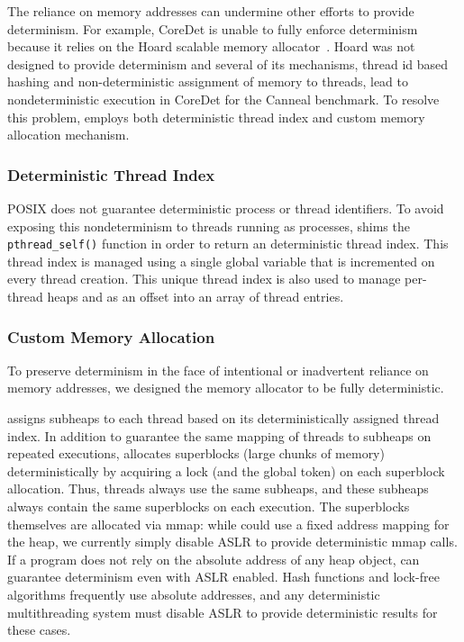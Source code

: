 The reliance on memory addresses can undermine other efforts to provide determinism. For example, CoreDet is unable to fully enforce determinism because it relies on the Hoard scalable memory allocator~\cite{Bergan:2010:CCR:1736020.1736029}. Hoard was not designed to provide determinism and several of its mechanisms, thread id based hashing and non-deterministic assignment of memory to threads, lead to nondeterministic execution in CoreDet for the Canneal benchmark. To resolve this problem, \dthreads{} employs both deterministic thread index and custom memory allocation mechanism. 

\subsubsection{Deterministic Thread Index}
\label{sec:threadindex}

POSIX does not guarantee deterministic process or thread identifiers. To avoid exposing this nondeterminism to threads running as processes, \dthreads{} shims the \texttt{pthread\_self()} function in order to return an deterministic thread index.  This thread index is managed using a single global variable that is incremented on every thread creation.  This unique thread index is also used to manage per-thread heaps and as an offset into an array of thread entries.

\subsubsection{Custom Memory Allocation}

To preserve determinism in the face of intentional or inadvertent reliance on memory addresses, we designed the \dthreads{} memory allocator to be fully deterministic. 

\dthreads{} assigns subheaps to each thread based on its deterministically assigned thread index. In addition to guarantee the same mapping of threads to subheaps on repeated executions, \dthreads{} allocates superblocks (large chunks of memory) deterministically by acquiring a lock (and the global token) on each superblock allocation. Thus, threads always use the same subheaps, and these subheaps always contain the same superblocks on each execution. The superblocks themselves are allocated via mmap: while \dthreads{} could use a fixed address mapping for the heap, we currently simply disable ASLR to provide deterministic mmap calls. If a program does not rely on the absolute address of any heap object, \dthreads{} can guarantee determinism even with ASLR enabled. Hash functions and lock-free algorithms frequently use absolute addresses, and any deterministic multithreading system must disable ASLR to provide deterministic results for these cases.


